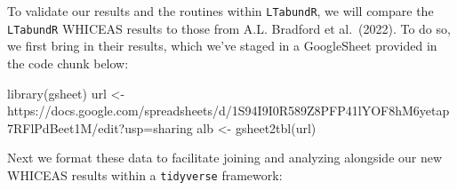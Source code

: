 \documentclass[
]{book}
\newenvironment{Shaded}{\begin{snugshade}}{\end{snugshade}}
\newcommand{\FunctionTok}[1]{\textcolor[rgb]{0.00,0.00,0.00}{#1}}
\newcommand{\NormalTok}[1]{#1}
\newcommand{\OtherTok}[1]{\textcolor[rgb]{0.56,0.35,0.01}{#1}}
\newcommand{\StringTok}[1]{\textcolor[rgb]{0.31,0.60,0.02}{#1}}
\begin{document}
To validate our results and the routines within \texttt{LTabundR}, we will compare the \texttt{LTabundR} WHICEAS results to those from A.L. Bradford et al.~(2022). To do so, we first bring in their results, which we've staged in a GoogleSheet provided in the code chunk below:

\begin{Shaded}
\begin{Highlighting}[]
\FunctionTok{library}\NormalTok{(gsheet)}
\NormalTok{url }\OtherTok{\textless{}{-}} \StringTok{\textquotesingle{}https://docs.google.com/spreadsheets/d/1S94I9I0R589Z8PFP41lYOF8hM6yetap7RFlPdBeet1M/edit?usp=sharing\textquotesingle{}}
\NormalTok{alb }\OtherTok{\textless{}{-}} \FunctionTok{gsheet2tbl}\NormalTok{(url)}
\end{Highlighting}
\end{Shaded}

Next we format these data to facilitate joining and analyzing alongside our new WHICEAS results within a \texttt{tidyverse} framework:
\end{document}
